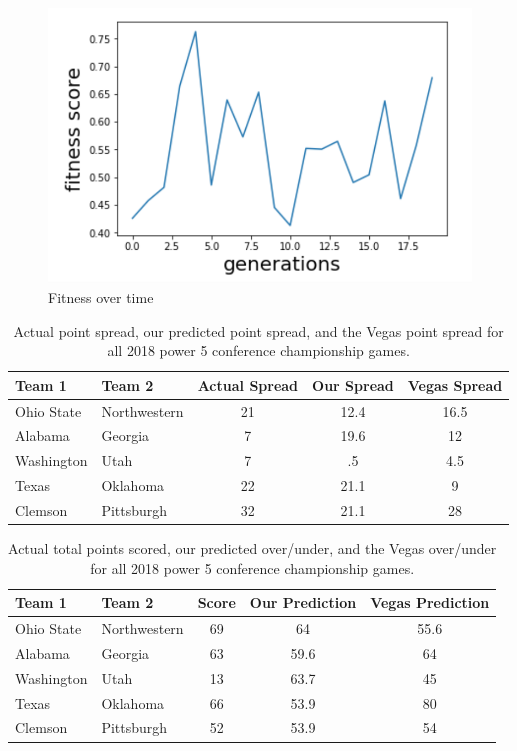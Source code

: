 \documentclass[10pt,twocolumn,letterpaper]{article}
\begin{document}
\begin{figure}[h]
\includegraphics{old_fitness_function.png}
\caption{\label{fitness}Fitness over time}
\end{figure}

\begin{table}
\begin{tabular}{llccc}
\hline
Team 1 & Team 2 & Actual Spread & Our Spread & Vegas Spread\\\hline
Ohio State & Northwestern&21&12.4&16.5\\
Alabama&Georgia&7&19.6&12\\
Washington&Utah&7&.5&4.5\\
Texas&Oklahoma&22&21.1&9\\
Clemson&Pittsburgh&32&21.1&28\\
\hline
\end{tabular}
\caption{\label{tab:casestudyspread} Actual point spread, our predicted point spread, and the Vegas point spread for all 2018 power 5 conference championship games.}
\end{table}

\begin{table}
\begin{tabular}{llccc}
\hline
Team 1 & Team 2 & Score & Our Prediction & Vegas Prediction\\\hline
Ohio State & Northwestern&69&64&55.6\\
Alabama&Georgia&63&59.6&64\\
Washington&Utah&13&63.7&45\\
Texas&Oklahoma&66&53.9&80\\
Clemson&Pittsburgh&52&53.9&54\\
\hline
\end{tabular}
\caption{\label{tab:casestudyou} Actual total points scored, our predicted over/under, and the Vegas over/under for all 2018 power 5 conference championship games.}
\end{table}
\end{document}

